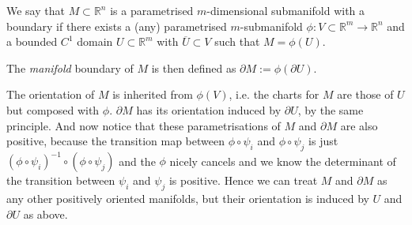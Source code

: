 \newpage

\begin{definition}\label{def:param-subm-boundary}
	We say that $M \subset \mathbb{R}^{n}$ is a parametrised $m$-dimensional submanifold with a boundary if there exists a (any) parametrised $m$-submanifold $\phi: V \subset \mathbb{R}^{m} \to \mathbb{R}^{n}$ and a bounded $C^{1}$ domain $U \subset \mathbb{R}^{m}$ with $\overline{ U } \subset V$ such that $M = \phi(U)$.

	The \textit{manifold} boundary of $M$ is then defined as $\partial M := \phi(\partial U)$.
	
	The orientation of $M$ is inherited from $\phi(V)$, i.e. the charts for $M$ are those of $U$ but composed with $\phi$. $\partial M$ has its orientation induced by $\partial U$, by the same principle. And now notice that these parametrisations of $M$ and $\partial M$ are also positive, because the transition map between $\phi \circ \psi_{i}$ and $\phi \circ \psi_{j}$ is just $(\phi \circ \psi_{i})^{-1} \circ (\phi \circ \psi_{j})$ and the $\phi$ nicely cancels and we know the determinant of the transition between $\psi_{i}$ and $\psi_{j}$ is positive. Hence we can treat $M$ and $\partial M$ as any other positively oriented manifolds, but their orientation is induced by $U$ and $\partial U$ as above.
\end{definition}

